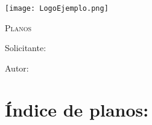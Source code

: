 \documentclass[main]{subfiles}
\begin{document}
\newpage
\thispagestyle{empty}
\begin{center}
    \centering
    \texttt{[image: LogoEjemplo.png]} \par
    \vspace{3 cm}
    {\scshape\Huge Planos \par}
    \vspace{1.5cm}
    {\itshape\Huge \TituloProyecto \par}
    \vfill
    {\Large Solicitante:  \Solicitante \par}
    \vspace{0.5cm}
    {\Large Autor:  \Autor \par}
    \vspace{1.5cm}
    {\Large \Fecha \par}
\end{center}

\chapter*{Índice de planos:}

%

\end{document}
